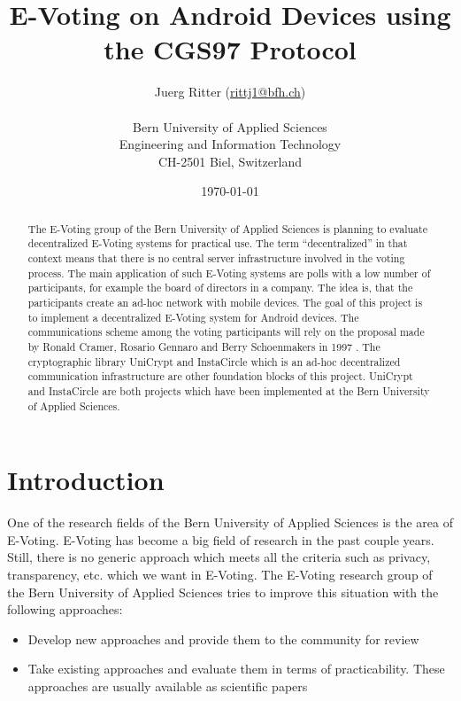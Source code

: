\documentclass[numbers=noenddot, abstract=on]{scrreprt}
\begin{document}
\title{\bf E-Voting on Android Devices using the CGS97 Protocol}
\subject{Master Thesis Proposal}
\author{Juerg Ritter (\url{rittj1@bfh.ch})\\
\\
Bern University of Applied Sciences\\
Engineering and Information Technology\\
CH-2501 Biel, Switzerland\\
}
\date{\today}
\publishers{Advisor:\\
Prof. Dr. Rolf Haenni, Bern University of Applied Sciences\\
\bigskip
Expert:\\
Stephan Neumann, Technical University of Darmstadt}
\maketitle



\begin{abstract}
The E-Voting group of the Bern University of Applied Sciences is planning to
evaluate decentralized E-Voting systems for practical use. The term
``decentralized'' in that context means that there is no central server
infrastructure involved in the voting process. The main application of such
E-Voting systems are polls with a low number of participants, for example the
board of directors in a company. The idea is, that the participants create an
ad-hoc network with mobile devices. The goal of this project is to implement a
decentralized E-Voting system for Android devices. The communications scheme among
the voting participants will rely on the proposal made by Ronald Cramer,
Rosario Gennaro and Berry Schoenmakers in 1997 \cite{CGS97}. The cryptographic
library UniCrypt and InstaCircle which is an ad-hoc decentralized communication infrastructure are
other foundation blocks of this project. UniCrypt and InstaCircle are both
projects which have been implemented at the Bern University of Applied Sciences.
\end{abstract}

\tableofcontents

\chapter{Introduction}
\label{cha:introduction}
One of the research fields of the Bern University of Applied Sciences is the
area of E-Voting. E-Voting has become a big field of research in the past couple
years. Still, there is no generic approach which meets all the criteria such as
privacy, transparency, etc. which we want in E-Voting. The E-Voting research
group of the Bern University of Applied Sciences \cite{www:EVG} tries to improve
this situation with the following approaches:
\begin{itemize}
  \item Develop new approaches and provide them to the community for review
  \item Take existing approaches and evaluate them in terms of practicability.
  These approaches are usually available as scientific papers
\end{itemize}
\end{document}
